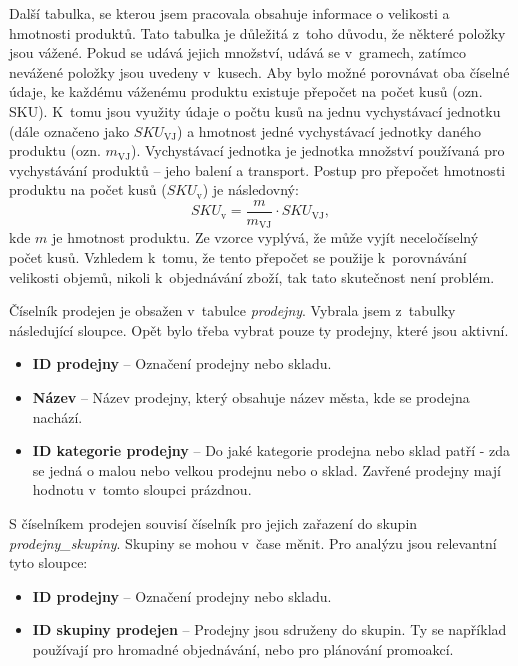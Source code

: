 Další tabulka, se kterou jsem pracovala obsahuje informace o velikosti a hmotnosti produktů. Tato tabulka je důležitá z~toho důvodu, že některé položky jsou vážené. Pokud se udává jejich množství, udává se v~gramech, zatímco nevážené položky jsou uvedeny v~kusech. Aby bylo možné porovnávat oba číselné údaje, ke každému váženému produktu existuje přepočet na počet kusů (ozn. SKU). K~tomu jsou využity údaje o počtu kusů na jednu vychystávací jednotku (dále označeno jako $SKU_{\mathrm{VJ}}$) a hmotnost jedné vychystávací jednotky daného produktu (ozn. $m_{\mathrm{VJ}}$). Vychystávací jednotka je jednotka množství používaná pro vychystávání produktů -- jeho balení a transport. Postup pro přepočet hmotnosti produktu na počet kusů ($SKU_{\mathrm{v}}$) je následovný: $$SKU_{\mathrm{v}} = \frac{m}{m_{\mathrm{VJ}}} \cdot SKU_{\mathrm{VJ}},$$
kde $m$ je hmotnost produktu. Ze vzorce vyplývá, že může vyjít neceločíselný počet kusů. Vzhledem k~tomu, že tento přepočet se použije k~porovnávání velikosti objemů, nikoli k~objednávání zboží, tak tato skutečnost není problém.



Číselník prodejen je obsažen v~tabulce \emph{prodejny}. Vybrala jsem z~tabulky následující sloupce. Opět bylo třeba vybrat pouze ty prodejny, které jsou aktivní.
\begin{itemize}
    \itemsep0em 
    \item \textbf{ID prodejny} -- Označení prodejny nebo skladu.
    \item \textbf{Název} -- Název prodejny, který obsahuje název města, kde se prodejna nachází.
    \item \textbf{ID kategorie prodejny} -- Do jaké kategorie prodejna nebo sklad patří - zda se jedná o malou nebo velkou prodejnu nebo o sklad. Zavřené prodejny mají hodnotu v~tomto sloupci prázdnou.
\end{itemize}

S číselníkem prodejen souvisí číselník pro jejich zařazení do skupin \emph{prodejny\_skupiny}. Skupiny se mohou v~čase měnit. Pro analýzu jsou relevantní tyto sloupce:
\begin{itemize}
    \itemsep0em 
    \item \textbf{ID prodejny} -- Označení prodejny nebo skladu.
    \item \textbf{ID skupiny prodejen} -- Prodejny jsou sdruženy do skupin. Ty se například používají pro hromadné objednávání, nebo pro plánování promoakcí. 
\end{itemize}    

